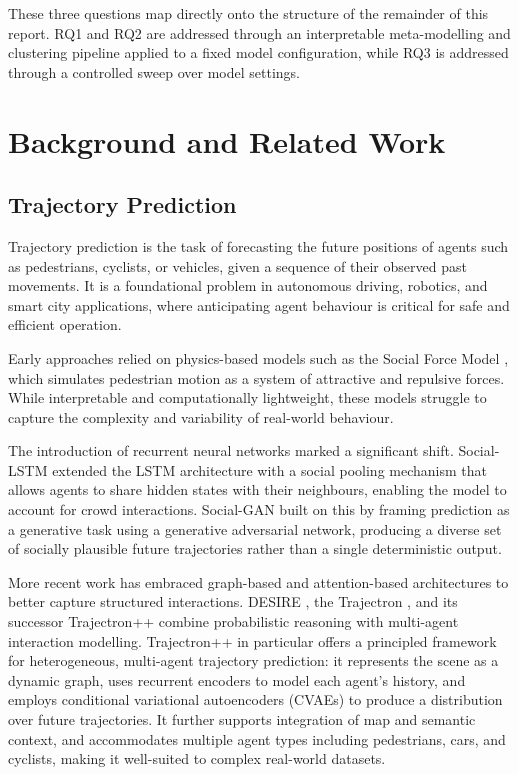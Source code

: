 \documentclass[12pt]{article}
\begin{document}
These three questions map directly onto the structure of the remainder of this report. RQ1 and RQ2 are addressed through an interpretable meta-modelling and clustering pipeline applied to a fixed model configuration, while RQ3 is addressed through a controlled sweep over model settings.

\clearpage
\section{Background and Related Work}

\subsection{Trajectory Prediction}
 
Trajectory prediction is the task of forecasting the future positions of agents such as pedestrians, cyclists, or vehicles, given a sequence of their observed past movements. It is a foundational problem in autonomous driving, robotics, and smart city applications, where anticipating agent behaviour is critical for safe and efficient operation.
 
Early approaches relied on physics-based models such as the Social Force Model \citep{helbing1995social}, which simulates pedestrian motion as a system of attractive and repulsive forces. While interpretable and computationally lightweight, these models struggle to capture the complexity and variability of real-world behaviour.
 
The introduction of recurrent neural networks marked a significant shift. Social-LSTM \citep{alahi2016social} extended the LSTM architecture with a social pooling mechanism that allows agents to share hidden states with their neighbours, enabling the model to account for crowd interactions. Social-GAN \citep{gupta2018social} built on this by framing prediction as a generative task using a generative adversarial network, producing a diverse set of socially plausible future trajectories rather than a single deterministic output.
 
More recent work has embraced graph-based and attention-based architectures to better capture structured interactions. DESIRE \citep{lee2017desire}, the Trajectron \citep{ivanovic2019trajectron}, and its successor Trajectron++ \citep{salzmann2020trajectron+} combine probabilistic reasoning with multi-agent interaction modelling. Trajectron++ in particular offers a principled framework for heterogeneous, multi-agent trajectory prediction: it represents the scene as a dynamic graph, uses recurrent encoders to model each agent's history, and employs conditional variational autoencoders (CVAEs) to produce a distribution over future trajectories. It further supports integration of map and semantic context, and accommodates multiple agent types including pedestrians, cars, and cyclists, making it well-suited to complex real-world datasets.
 
\end{document}
